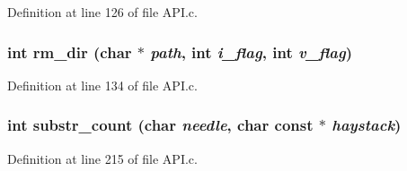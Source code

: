 Definition at line 126 of file API.c.

\subsubsection[{rm\_\-dir}]{\setlength{\rightskip}{0pt plus 5cm}int rm\_\-dir (char $\ast$ {\em path}, \/  int {\em i\_\-flag}, \/  int {\em v\_\-flag})}\label{_a_p_i_8c_a021d2adf79158fda37d6da17998b89fe}


Definition at line 134 of file API.c.

\subsubsection[{substr\_\-count}]{\setlength{\rightskip}{0pt plus 5cm}int substr\_\-count (char {\em needle}, \/  char const $\ast$ {\em haystack})}\label{_a_p_i_8c_a99b1da9d255cd766ab8f521748a79a89}


Definition at line 215 of file API.c.

